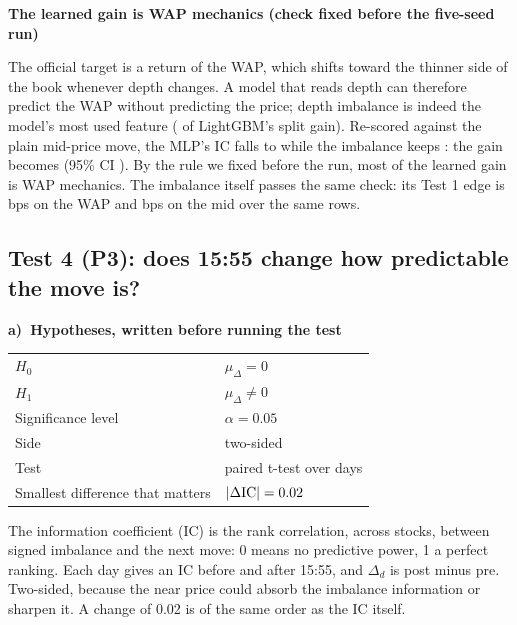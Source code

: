 \documentclass[10pt,a4paper,twocolumn]{article}
\newcommand{\tpart}[2]{\par\needspace{12\baselineskip}\smallskip\textbf{#1)~#2}\par}
\newcommand{\minihead}[1]{\par\needspace{8\baselineskip}\smallskip\textbf{#1}\par}
\begin{document}
\minihead{The learned gain is WAP mechanics (check fixed before the five-seed run)}
The official target is a return of the WAP, which shifts toward the thinner side of the book whenever depth changes.
A model that reads depth can therefore predict the WAP without predicting the price; depth imbalance is indeed the
model's most used feature (\nImpFirstShare{} of LightGBM's split gain). Re-scored against the plain mid-price
move, the MLP's IC falls to \nMidMlp{} while the imbalance keeps \nMidBase{}: the gain becomes \nMidGain{} (95\% CI
\nMidGainCi). By the rule we fixed before the run, most of the learned gain is WAP mechanics. The imbalance itself
passes the same check: its Test 1 edge is \nWapOneEst{} bps on the WAP and \nMidOneEst{} bps on the mid over the same
rows.

\subsection*{Test 4 (P3): does 15:55 change how predictable the move is?}

\tpart{a}{Hypotheses, written before running the test}
{\small
\begin{tabularx}{\linewidth}{@{}K{3.4cm} Y@{}}
\toprule
$H_0$ & $\mu_\Delta=0$ \\
$H_1$ & $\mu_\Delta\neq0$ \\
Significance level & $\alpha=0.05$ \\
Side & two-sided \\
Test & paired t-test over days \\
Smallest difference that matters & $|\Delta\text{IC}|=0.02$ \\
\bottomrule
\end{tabularx}}

The information coefficient (IC) is the rank correlation, across stocks, between signed imbalance and the next move:
0 means no predictive power, 1 a perfect ranking. Each day gives an IC before and after 15:55, and $\Delta_d$ is
post minus pre. Two-sided, because the near price could absorb the imbalance information or sharpen it. A change of
0.02 is of the same order as the IC itself.
\end{document}
